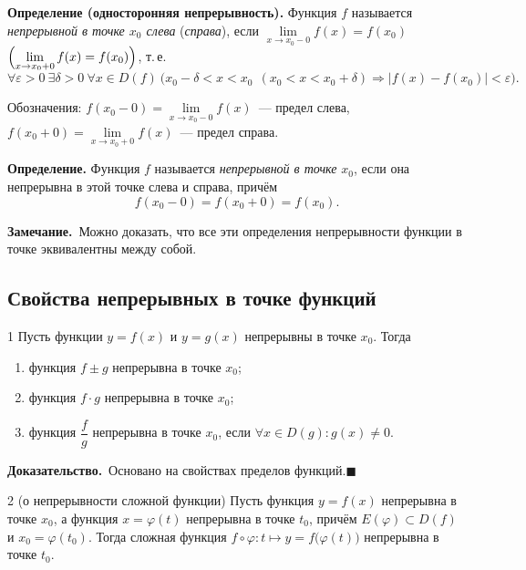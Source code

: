 \documentclass[a4paper,11pt]{article}
\newcommand{\zam}{\textbf{Замечание.}\ }
\newcommand{\dok}{\textbf{Доказательство.}\ }
\newcommand{\qedr}{\hfill$\blacksquare$}
\begin{document}
\begin{opr}
\textbf{Определение (односторонняя непрерывность).} Функция $f$ называется \emph{непрерывной в точке
$x_0$ слева} (\emph{справа}), если $\lim\limits_{x \to x_0 - 0} f(x) = f(x_0)$
$\Bigl(\lim\limits_{x \to x_0 + 0} f(x) = f(x_0)\Bigr)$, т.\,е.
\[
  \forall \varepsilon > 0\ \exists \delta > 0\ \forall x \in D(f)\
  \bigl( x_0 - \delta < x < x_0\ \ (x_0 < x < x_0 + \delta) \Rightarrow |f(x) - f(x_0)| < \varepsilon \bigr).
\]
\end{opr}

Обозначения: $f(x_0 - 0) = \lim\limits_{x \to x_0 - 0} f(x)$~--- предел слева,
$f(x_0 + 0) = \lim\limits_{x \to x_0 + 0} f(x)$~--- предел справа.

\begin{opr}
\textbf{Определение.} Функция $f$ называется \emph{непрерывной в точке} $x_0$, если она непрерывна
в этой точке слева и справа, причём
\[
  f(x_0 - 0) = f(x_0 + 0) = f(x_0).
\]
\end{opr}

\zam Можно доказать, что все эти определения непрерывности функции в точке эквивалентны между собой.

\subsection{Свойства непрерывных в точке функций}

\begin{teor}{1}
  Пусть функции $y = f(x)$ и $y = g(x)$ непрерывны в точке $x_0$. Тогда
  \begin{enumerate}[label=\arabic*)]
    \item функция $f \pm g$ непрерывна в точке $x_0$;
    \item функция $f \cdot g$ непрерывна в точке $x_0$;
    \item функция $\dfrac{f}{g}$ непрерывна в точке $x_0$, если $\forall x \in D(g)\colon g(x) \ne 0$.
  \end{enumerate}
\end{teor}

\dok Основано на свойствах пределов функций.\qedr

\begin{teor}{2 (о непрерывности сложной функции)}
  Пусть функция $y = f(x)$ непрерывна в точке $x_0$, а функция $x = \varphi(t)$ непрерывна в точке
  $t_0$, причём $E(\varphi) \subset D(f)$ и $x_0 = \varphi(t_0)$. Тогда сложная функция
  $f \circ \varphi\colon t \mapsto y = f\bigl(\varphi(t)\bigr)$ непрерывна в точке $t_0$.
\end{teor}
\end{document}
